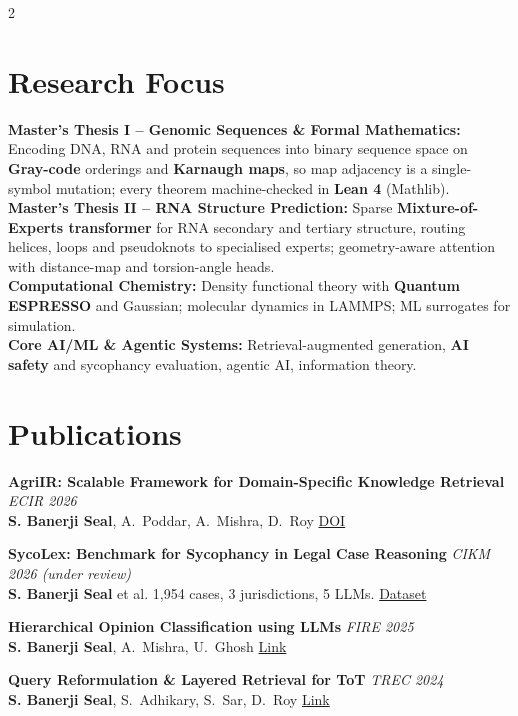 \documentclass[a4paper,9pt]{article}
\newcommand{\entry}[3]{%
  {\scriptsize\textbf{#1}} \hfill {\tiny\textit{#2}}\\[-0.1em]
  {\tiny #3}\vspace{1.5pt}%
}
\begin{document}
\begin{paracol}{2}


	\section{Research Focus}

	 {\tiny
	  \textbf{Master's Thesis I -- Genomic Sequences \& Formal Mathematics:} Encoding DNA, RNA and protein sequences into binary sequence space on \textbf{Gray-code} orderings and \textbf{Karnaugh maps}, so map adjacency is a single-symbol mutation; every theorem machine-checked in \textbf{Lean 4} (Mathlib).\\[2pt]
	  \textbf{Master's Thesis II -- RNA Structure Prediction:} Sparse \textbf{Mixture-of-Experts transformer} for RNA secondary and tertiary structure, routing helices, loops and pseudoknots to specialised experts; geometry-aware attention with distance-map and torsion-angle heads.\\[2pt]
	  \textbf{Computational Chemistry:} Density functional theory with \textbf{Quantum ESPRESSO} and Gaussian; molecular dynamics in LAMMPS; ML surrogates for simulation.\\[2pt]
	  \textbf{Core AI/ML \& Agentic Systems:} Retrieval-augmented generation, \textbf{AI safety} and sycophancy evaluation, agentic AI, information theory.
	 }

	\section{Publications}

	\entry{AgriIR: Scalable Framework for Domain-Specific Knowledge Retrieval}{ECIR 2026}{%
		\textbf{S. Banerji Seal}, A.~Poddar, A.~Mishra, D.~Roy
		\href{https://doi.org/10.1007/978-3-032-21324-2_37}{\tiny DOI}}

	\entry{SycoLex: Benchmark for Sycophancy in Legal Case Reasoning}{CIKM 2026 (under review)}{%
		\textbf{S. Banerji Seal} et al. 1,954 cases, 3 jurisdictions, 5 LLMs.
		\href{https://huggingface.co/datasets/ShuvBan/SycoLex}{\tiny Dataset}}

	\entry{Hierarchical Opinion Classification using LLMs}{FIRE 2025}{%
		\textbf{S. Banerji Seal}, A.~Mishra, U.~Ghosh
		\href{https://ceur-ws.org/Vol-4173/T10-3.pdf}{\tiny Link}}

	\entry{Query Reformulation \& Layered Retrieval for ToT}{TREC 2024}{%
		\textbf{S. Banerji Seal}, S.~Adhikary, S.~Sar, D.~Roy
		\href{https://trec.nist.gov/pubs/trec33/papers/IISER-K.tot.pdf}{\tiny Link}}


\end{paracol}
\end{document}
